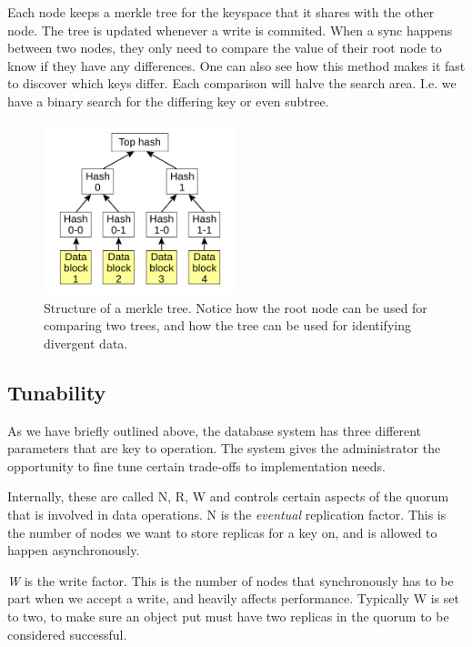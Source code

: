 Each node keeps a merkle tree for the keyspace that it shares with the other node. The tree is updated whenever a write is commited.
When a sync happens between two nodes, they only need to compare the value of their root node to know if they have any differences.
One can also see how this method makes it fast to discover which keys differ. Each comparison will halve the search area.
I.e. we have a binary search for the differing key or even subtree.

\begin{figure}[h]
    \centering
    \includegraphics[width=0.5\textwidth]{background/figures/hashtree}
    \caption{Structure of a merkle tree. Notice how the root node can be used for comparing two trees, and how the tree can be used for identifying divergent data.}
    \label{fig:merkletree}
\end{figure}

\subsection{Tunability}
\label{sec:tunability}
As we have briefly outlined above, the database system has three different parameters that are key to operation.
The system gives the administrator the opportunity to fine tune certain trade-offs to implementation needs.

Internally, these are called N, R, W and controls certain aspects of the quorum that is involved in data operations. N is the \emph{eventual} replication factor.
This is the number of nodes we want to store replicas for a key on, and is allowed to happen asynchronously.

\emph{W} is the write factor. This is the number of nodes that synchronously has to be part when we accept a write, and heavily affects performance. 
Typically W is set to two, to make sure an object put must have two replicas in the quorum to be considered successful. 

